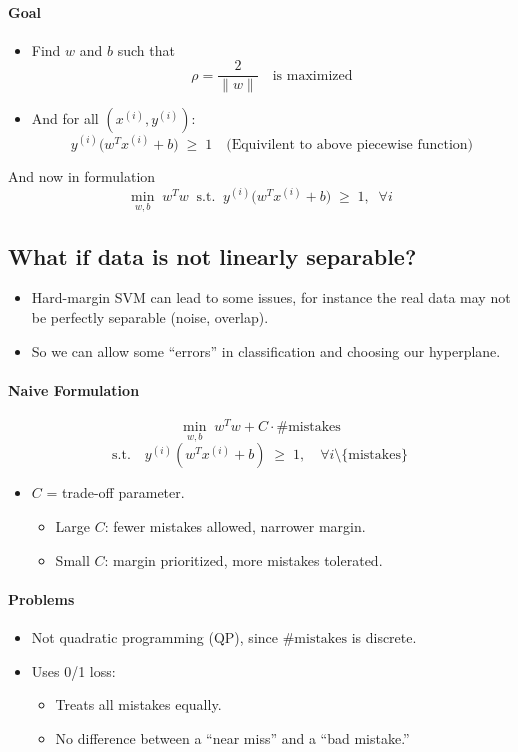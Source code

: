 \documentclass[11pt]{article}
\begin{document}
\paragraph{Goal}
\begin{itemize}
    \item Find $w$ and $b$ such that
    \[
    \rho = \frac{2}{\|w\|} \quad \text{is maximized}
    \]
    \item And for all $(x^{(i)}, y^{(i)})$:
    \[
    y^{(i)} \big(w^T x^{(i)} + b\big) \;\geq\; 1 \quad \text{(Equivilent to above piecewise function)}
    \]
\end{itemize}

And now in formulation
\[
 \min_{w,b} \; w^Tw \; \; \text{s.t.} \; \; y^{(i)} \big(w^T x^{(i)} + b\big) \;\geq\; 1, 
\; \; \forall i
\]

\subsection*{What if data is not linearly separable?}

\begin{itemize}
    \item Hard-margin SVM can lead to some issues, for instance the real data may not be perfectly separable (noise, overlap).
    \item So we can allow some ``errors'' in classification and choosing our hyperplane.
\end{itemize}

\paragraph*{Naive Formulation}
\[
\min_{w,b} \; w^T w + C \cdot \#\text{mistakes}
\]
\[
\text{s.t.} \quad y^{(i)}(w^T x^{(i)} + b) \;\geq\; 1, \quad \forall i \setminus \{\text{mistakes}\}
\]

\begin{itemize}
    \item $C$ = trade-off parameter.
        \begin{itemize}
            \item Large $C$: fewer mistakes allowed, narrower margin.
            \item Small $C$: margin prioritized, more mistakes tolerated.
        \end{itemize}
\end{itemize}

\paragraph*{Problems}
\begin{itemize}
    \item Not quadratic programming (QP), since $\#\text{mistakes}$ is discrete.
    \item Uses 0/1 loss:
    \begin{itemize}
        \item Treats all mistakes equally.
        \item No difference between a ``near miss'' and a ``bad mistake.''
    \end{itemize}
\end{itemize}
\end{document}
